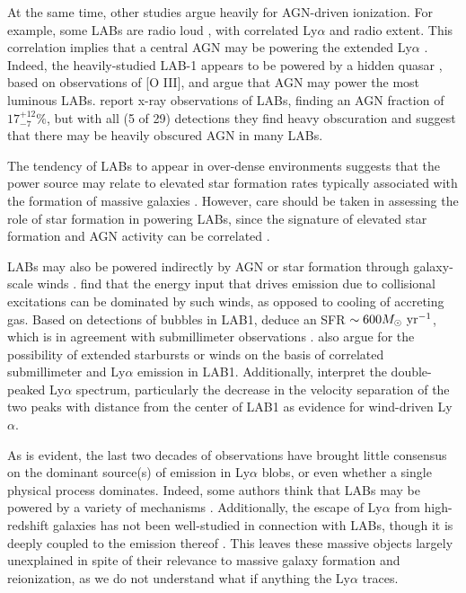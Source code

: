At the same time, other studies argue heavily for AGN-driven ionization.
For example, some LABs are radio loud \citep{Miley2008}, with correlated Ly$\alpha$ and radio extent.
This correlation implies that a central AGN may be powering the extended Ly$\alpha$ \citep{vanOjik1997}.
Indeed, the heavily-studied LAB-1 appears to be powered by a hidden quasar \citep{Overzier2013}, based on observations of \textsc{[O III]}, and argue that AGN may power the most luminous LABs.
\citet{Geach2009} report x-ray observations of LABs, finding an AGN fraction of $17^{+12}_{-7}\%$, but with all (5 of 29) detections they find heavy obscuration and suggest that there may be heavily obscured AGN in many LABs.

The tendency of LABs to appear in over-dense environments \citep{Matsuda2009,Matsuda2011,Prescott2008} suggests that the power source may relate to elevated star formation rates typically associated with the formation of massive galaxies \citep[e.g.][]{Matsuda2007,Kubo2013,Hine2016,Alexander2016}.
However, care should be taken in assessing the role of star formation in powering LABs, since the signature of elevated star formation and AGN activity can be correlated \citep{Webb2009}.

LABs may also be powered indirectly by AGN or star formation through galaxy-scale winds \citep{Wilman2005}.
\citet{Sravan2016} find that the energy input that drives emission due to collisional excitations can be dominated by such winds, as opposed to cooling of accreting gas.
Based on detections of bubbles in LAB1, \citet{Matsuda2004} deduce an SFR $\sim 600M_{\odot}\ \rm{yr}^{-1}$, which is in agreement with submillimeter observations \citep{Chapman2001}.
\citet{Matsuda2007} also argue for the possibility of extended starbursts or winds on the basis of correlated submillimeter and Ly$\alpha$ emission in LAB1.
Additionally, \citet{Ohyama2003} interpret the double-peaked Ly$\alpha$ spectrum, particularly the decrease in the velocity separation of the two peaks with distance from the center of LAB1 as evidence for wind-driven Ly$\alpha$.

As is evident, the last two decades of observations have brought little consensus on the dominant source(s) of emission in Ly$\alpha$ blobs, or even whether a single physical process dominates.
Indeed, some authors think that LABs may be powered by a variety of mechanisms \citep{Scarlata2009,Webb2009,Nilsson2006,Prescott2009,Ao2015}.
Additionally, the escape of Ly$\alpha$ from high-redshift galaxies has not been well-studied in connection with LABs, though it is deeply coupled to the emission thereof \citep{Smith2019}.
This leaves these massive objects largely unexplained in spite of their relevance to massive galaxy formation and reionization, as we do not understand what if anything the Ly$\alpha$ traces.

